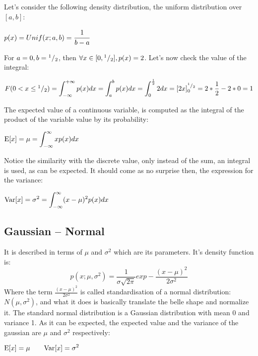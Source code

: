 Let's consider the following density distribution, the uniform distribution over $[a,b]$:
\begin{center}
	$\displaystyle p(x)=Unif(x;a,b)=\cfrac{1}{b-a}$
\end{center}
For $a=0, b={}^{1}/_{2}$, then $\forall x\in[0,{}^{1}/_{2}], p(x)=2$. Let's now check the value of the integral: 
\begin{center}
	$F(0<x\leq {}^{1}/_{2})=\displaystyle \int_{-\infty}^{+\infty}p(x)dx=\int_a^bp(x)dx=\int_0^{\frac{1}{2}}2dx=[2x]^{{}^{1}/_{2}}_0=2*\frac{1}{2}-2*0=1$
\end{center}
The expected value of a continuous variable, is computed as the integral of the product of the variable value by its probability:
\begin{center}
	$\displaystyle \text{E}[x]=\mu=\int_{-\infty}^\infty xp(x)dx$
\end{center}
Notice the similarity with the discrete value, only instead of the sum, an integral is used, as can be expected. It should come as no surprise then, the expression for the variance:
\begin{center}
	$\displaystyle \text{Var}[x]=\sigma^2=\int_{-\infty}^\infty(x-\mu)^2p(x)dx$
\end{center}
%
%
\subsection{Gaussian -- Normal}
It is described in terms of $\mu$ and $\sigma^2$ which are its parameters.\newline
It's density function is:
\begin{equation}
	p(x;\mu, \sigma^2)=\frac{1}{\sigma\sqrt{2\pi}}exp-\frac{(x-\mu)^2}{2\sigma^2}
	\label{eq:Gaussian}
\end{equation}
Where the term $\displaystyle \frac{(x-\mu)^2}{2\sigma^2}$ is called standardisation of a normal distribution: $N(\mu,\sigma^2)$, and what it does is basically translate the belle shape and normalize it.\newline
The standard normal distribution is a Gaussian distribution with mean 0 and variance 1. \newline
As it can be expected, the expected value and the variance of the gaussian are $\mu$ and $\sigma^2$ respectively:
\begin{center}
	$\displaystyle \text{E}[x]=\mu\qquad \text{Var}[x]=\sigma^2$
\end{center}

